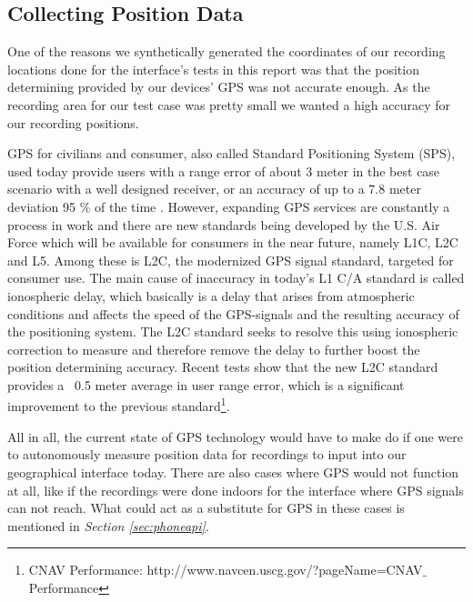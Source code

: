 \subsection{Collecting Position Data}
\label{sec:collectingpositiondata}
One of the reasons we synthetically generated the coordinates of our recording locations done for the interface’s tests in this report was that the position determining provided by our devices’ GPS was not accurate enough. As the recording area for our test case was pretty small we wanted a high accuracy for our recording positions. 

GPS for civilians and consumer, also called Standard Positioning System (SPS), used today provide users with a range error of about 3 meter in the best case scenario with a well designed receiver, or an accuracy of up to a 7.8 meter deviation 95 \% of the time \cite{spsperf}. However, expanding GPS services are constantly a process in work and there are new standards being developed by the U.S. Air Force which will be available for consumers in the near future, namely L1C, L2C and L5. Among these is L2C, the modernized GPS signal standard, targeted for consumer use. The main cause of inaccuracy in today’s L1 C/A standard is called ionospheric delay, which basically is a delay that arises from atmospheric conditions and affects the speed of the GPS-signals and the resulting accuracy of the positioning system. The L2C standard seeks to resolve this using ionospheric correction to measure and therefore remove the delay to further boost the position determining accuracy.\cite{gpsdir} Recent tests show that the new L2C standard provides a ~0.5 meter average in user range error, which is a significant improvement to the previous standard\footnote{CNAV Performance: http://www.navcen.uscg.gov/?pageName=CNAV$\_$Performance}.

All in all, the current state of GPS technology would have to make do if one were to autonomously measure position data for recordings to input into our geographical interface today. There are also cases where GPS would not function at all, like if the recordings were done indoors for the interface where GPS signals can not reach. What could act as a substitute for GPS in these cases is mentioned in \textit{Section \ref{sec:phoneapi}}.

